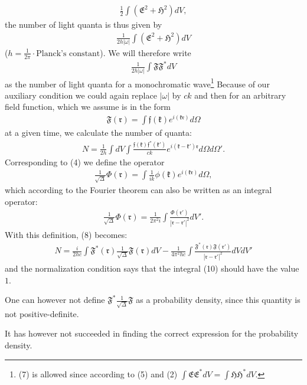 \documentclass[a4paper,11pt]{article}
\newcommand{\?}[2]{#1\footnote{\textsc{Translator note}: #2}}
\newcommand{\nequ}[2]{\begin{align*}\tag{#1}#2\end{align*}}
\newcommand{\uequ}[1]{\begin{align*}#1\end{align*}}
\renewcommand{\exp}[1]{e^{#1}}
\newcommand{\mf}[1]{\mathfrak{#1}}
\begin{document}
\uequ{
\frac{1}{2}\int\left(\mf{E}^2 + \mf{H}^2\right)dV,
}
the number of light quanta is thus given by
\uequ{
\frac{1}{2 h |\omega|}\int\left(\mf{E}^2 + \mf{H}^2\right)dV
}
($h=\frac{1}{2\pi}\cdot\text{Planck's constant}$). We will therefore write
\nequ{7}{
\frac{1}{2h|\omega|}\int\mf{F}\mf{F}^*dV
}
as the number of light quanta for a monochromatic wave\footnote{(7) is allowed since according to (5) and (2) $\int\mf{E}\mf{E}^*dV = \int\mf{H}\mf{H}^*dV.$} Because of our auxiliary condition we could again replace $|\omega|$ by $ck$ and then for an arbitrary field function, which we assume is in the form
\uequ{
\mf{F}(\mf{r}) = \int\mf{f}(\mf{k})\exp{i(\mf{kr})}d\Omega
}
at a given time, we calculate the number of quanta:
\nequ{8}{
N=\frac{1}{2h}\int dV \int \frac{\mf{f}(\mf{k})\mf{f}^*(\mf{k}')}{ck}
\exp{i(\mf{k} - \mf{k}')\mf{r}}d\Omega d\Omega'.
}
Corresponding to (4) we define the operator
\nequ{9}{
\frac{1}{\sqrt{\Delta}}\Phi(\mf{r}) = 
\int \frac{1}{ik}\phi(\mf{k})\exp{i(\mf{kr})}d\Omega,
}
which according to the Fourier theorem can also be written as an integral operator:
\nequ{9a}{
\frac{1}{\sqrt{\Delta}}\Phi(\mf{r}) = \frac{1}{2\pi^2 i}
\int \frac{\Phi(\mf{r}')}{|\mf{r}-\mf{r}'|^2} dV'.
}
With this definition, (8) becomes:
\nequ{10}{
N = \frac{i}{2hc}\int \mf{F}^*(\mf{r})\frac{1}{\sqrt\Delta}\mf{F}(\mf{r})dV - 
\frac{1}{4\pi^2 hc}\int \frac{\mf{F}^*(\mf{r})\mf{F}(\mf{r}')}{\left|\mf{r}-\mf{r}'\right|^2}{dV}{dV'}
}
and the normalization condition says that the integral (10) should have the value $1$.

One can however not define $\mf{F}^*\frac{1}{\sqrt{\Delta}}\mf{F}$ as a probability density, since this quantity is not positive-definite.

It has however not succeeded in finding the correct expression for the probability density.
\end{document}

